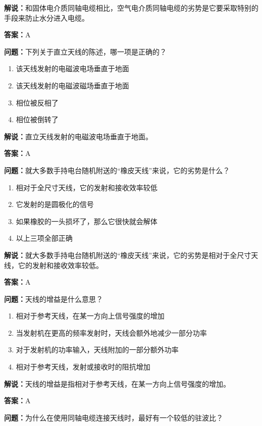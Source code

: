 \textbf{解说：}和固体电介质同轴电缆相比，空气电介质同轴电缆的劣势是它要采取特别的手段来防止水分进入电缆。%

\textbf{答案：}A

\textbf{问题：}下列关于直立天线的陈述，哪一项是正确的？

\begin{enumerate}[label=\Alph*), leftmargin=3em]
	\item 该天线发射的电磁波电场垂直于地面
	\item 该天线发射的电磁波磁场垂直于地面
	\item 相位被反相了
	\item 相位被倒转了
\end{enumerate}

\textbf{解说：}直立天线发射的电磁波电场垂直于地面。%

\textbf{答案：}A

\textbf{问题：}就大多数手持电台随机附送的“橡皮天线”来说，它的劣势是什么？

\begin{enumerate}[label=\Alph*), leftmargin=3em]
	\item 相对于全尺寸天线，它的发射和接收效率较低
	\item 它发射的是圆极化的信号
	\item 如果橡胶的一头损坏了，那么它很快就会解体
	\item 以上三项全部正确
\end{enumerate}

\textbf{解说：}就大多数手持电台随机附送的“橡皮天线”来说，它的劣势是相对于全尺寸天线，它的发射和接收效率较低。%

\textbf{答案：}A

\textbf{问题：}天线的增益是什么意思？

\begin{enumerate}[label=\Alph*), leftmargin=3em]
	\item 相对于参考天线，在某一方向上信号强度的增加
	\item 当发射机在更高的频率发射时，天线会额外地减少一部分功率
	\item 对于发射机的功率输入，天线附加的一部分额外功率
	\item 相对于参考天线，发射或接收时的阻抗增加
\end{enumerate}

\textbf{解说：}天线的增益是指相对于参考天线，在某一方向上信号强度的增加。%

\textbf{答案：}A

\textbf{问题：}为什么在使用同轴电缆连接天线时，最好有一个较低的驻波比？

